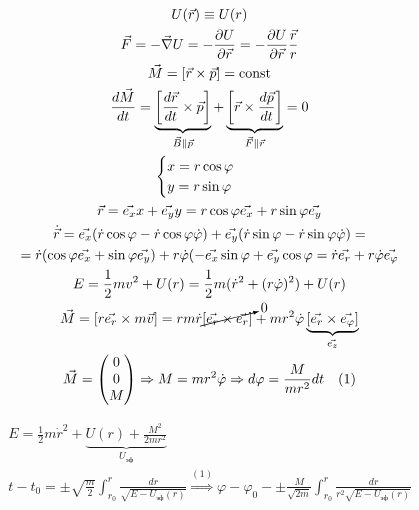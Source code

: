 \documentclass[12pt, a4paper]{report}
\begin{document}
\begin{gather*}
    U(\vec{r})\equiv  U ( r)\\
    \vec{F}= - \vec{\nabla }U = - \frac{\partial U}{\partial \vec{r}}= - \frac{\partial U}{\partial \vec{r}} \frac{\vec{r}}{r}    \\
    \vec{M}= [ \vec{r}\times \vec{p }]= \mathrm{const} \\
    \frac{d \vec{M}}{d t }= \underbrace{\left[ \frac{d \vec{ r }} { d t}\times  \vec{p}  \right]}_{\vec{B} \parallel \vec{p}  }    + \underbrace{\left[ \vec{r} \times \frac{d \vec{p}}{d t} \right]}_{\vec{F} \parallel \vec{r} }  =0 \\
    \begin{aligned}
        \begin{cases}
            x= r \cos  \varphi \\    
            y = r \sin  \varphi 
        \end{cases}
        \quad  
    \end{aligned} \\
    \vec{r}= \vec{e_x}x + \vec{e_y}y =  r\cos \varphi \vec{e_x} + r\sin \varphi \vec{e_y} \\  
    \dot{\vec{r}}=\vec{e _ x}( \dot{r} \cos \varphi - \dot{r} \cos  \varphi \dot{\varphi}  ) + \vec{e_y}( \dot{r} \sin \varphi - \dot{r} \sin  \varphi \dot{\varphi}  ) = \\
    =\dot{r}( \cos \varphi \vec{e_x} + \sin \varphi \vec{e_y})+ r \dot{ \varphi}(- \vec{e_x} \sin \varphi + \vec{e_y} \cos \varphi = \dot{r} \vec{e_r}+r \dot{\varphi} \vec{e _{\varphi} } \\
    E = \frac{1}{ 2} m v ^2 + U ( r) = \frac{1}{2 }m ( \dot{ r } ^2+ ( r \dot{\varphi}) ^2  ) + U ( r)     \\
    \vec{M} = [ r \vec{ e_r}\times  m \vec{ v}]= r m \dot{r } \cancelto{0}{[\vec{e_r}\times \vec{e_r}]}+ m r ^2 \dot{\varphi} \underbrace{[\vec{e_r}\times  \vec{ e _{\varphi} }]}_{\vec{e_z}}  \\
    \vec{M}=\begin{pmatrix}
    0\\
    0\\
    M
    \end{pmatrix} \Rightarrow M = m r ^2 \dot{\varphi}  \Rightarrow d \varphi = \frac{M}{m r ^2 } dt  \quad  (1)
\end{gather*}

\begin{gather*}
    E = \frac{1}{ 2 } m \dot{r} ^2 +  \underbrace{U(r) + \frac{M ^2}{2 mr ^2 }}_{U_{\text{эф}}}     \\
    t-t_0 = \pm  \sqrt{\frac{m}{2} } \int_{ r_0}^{r}   \frac{dr}{\sqrt{E - U _{\text{эф}}(r) }} \overset{(1)}{\Rightarrow }   \varphi - \varphi_0 - \pm \frac{M}{\sqrt{2m}} \int_{r_0}^{r} \frac{dr}{r ^2 \sqrt{E - U _{\text{эф}}(r) }}   
\end{gather*}
\end{document}
